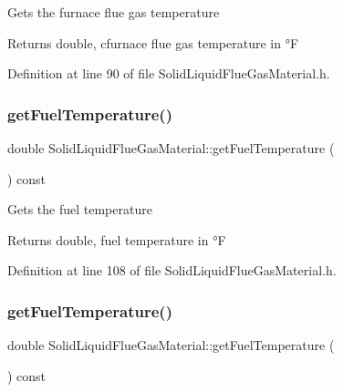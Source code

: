 Gets the furnace flue gas temperature \begin{DoxyReturn}{Returns}
double, cfurnace flue gas temperature in °F 
\end{DoxyReturn}


Definition at line 90 of file Solid\+Liquid\+Flue\+Gas\+Material.\+h.

\mbox{\label{class_solid_liquid_flue_gas_material_a629ecc7104b6bfbb696d9478c4b48e7a}} 
\subsubsection{\texorpdfstring{get\+Fuel\+Temperature()}{getFuelTemperature()}\hspace{0.1cm}{\footnotesize\ttfamily [1/3]}}
{\footnotesize\ttfamily double Solid\+Liquid\+Flue\+Gas\+Material\+::get\+Fuel\+Temperature (\begin{DoxyParamCaption}{ }\end{DoxyParamCaption}) const\hspace{0.3cm}{\ttfamily [inline]}}

Gets the fuel temperature \begin{DoxyReturn}{Returns}
double, fuel temperature in °F 
\end{DoxyReturn}


Definition at line 108 of file Solid\+Liquid\+Flue\+Gas\+Material.\+h.

\mbox{\label{class_solid_liquid_flue_gas_material_a629ecc7104b6bfbb696d9478c4b48e7a}} 
\subsubsection{\texorpdfstring{get\+Fuel\+Temperature()}{getFuelTemperature()}\hspace{0.1cm}{\footnotesize\ttfamily [2/3]}}
{\footnotesize\ttfamily double Solid\+Liquid\+Flue\+Gas\+Material\+::get\+Fuel\+Temperature (\begin{DoxyParamCaption}{ }\end{DoxyParamCaption}) const\hspace{0.3cm}{\ttfamily [inline]}}

